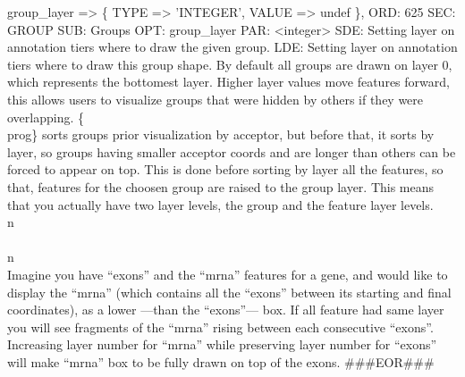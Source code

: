 \documentclass[11pt]{article}
\def\nwendcode{\endtrivlist \endgroup} %
\let\nwdocspar=\par                    %
\begin{document}
\nwenddocs{}\endmoddef
group_layer                  => \{ TYPE => 'INTEGER', VALUE => undef \},
\eatline
{}\nwendcode{}\plusendmoddef
ORD: 625
SEC: GROUP
SUB: Groups
OPT: group_layer
PAR: <integer>
SDE: Setting layer on annotation tiers where to draw the given group.
LDE: 
Setting layer on annotation tiers where to draw this group shape. By default
all groups are drawn on layer 0, which represents the bottomest layer. Higher
layer values move features forward, this allows users to visualize groups that
were hidden by others if they were overlapping. \{\\prog\} sorts groups prior
visualization by acceptor, but before that, it sorts by layer, so groups 
having smaller acceptor coords and are longer than others can be forced to
appear on top. This is done before sorting by layer all the features, so that,
features for the choosen group are raised to the group layer. This means that
you actually have two layer levels, the group and the feature layer levels.
 \\n\\ \\n\\
Imagine you have ``exons'' and the ``mrna'' features for a gene, and would like
to display the ``mrna'' (which contains all the ``exons'' between its starting 
and final coordinates), as a lower ---than the ``exons''--- box. If all 
feature had same layer you will see fragments of the ``mrna'' rising between 
each consecutive ``exons''. Increasing layer number for ``mrna'' while 
preserving layer number for ``exons'' will make ``mrna'' box to be fully drawn
on top of the exons. 
###EOR###
\nwendcode{}\nwdocspar
\end{document}
